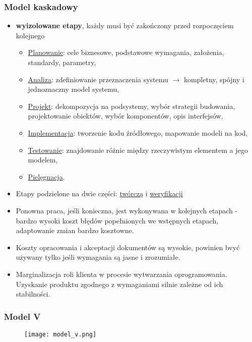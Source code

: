\documentclass[../main.tex]{subfiles}
\begin{document}
    \subsubsection{Model kaskadowy}
    \begin{itemize}
        \item \textbf{wyizolowane etapy}, każdy musi być zakończony przed rozpoczęciem kolejnego
        \begin{itemize}
            \item \underline{Planowanie}: cele biznesowe, podstawowe wymagania, założenia, standardy, parametry,
            \item \underline{Analiza}: zdefiniowanie przeznaczenia systemu $\rightarrow$ kompletny, spójny i jednoznaczny model systemu,
            \item \underline{Projekt}: dekompozycja na podsystemy, wybór strategii budowania, projektowanie obiektów, wybór komponentów, opis interfejsów,
            \item \underline{Implementacja}: tworzenie kodu źródłowego, mapowanie modeli na kod,
            \item \underline{Testowanie}: znajdowanie różnic między rzeczywistym elementem a jego modelem,
            \item \underline{Pielęgnacja}.
        \end{itemize}
        \item Etapy podzielone na dwie części: \underline{twórczą} i \underline{weryfikacji}
        \item Ponowna praca, jeśli konieczna, jest wykonywana w kolejnych etapach - bardzo wysoki koszt błędów
        popełnionych we wstępnych etapach, adaptowanie zmian bardzo kosztowne.
        \item Koszty opracowania i akceptacji dokumentów są wysokie, powinien bvyć używany
        tylko jeśli wymagania są jasne i zrozumiałe.
        \item Marginalizacja roli klienta w procesie wytwarzania oprogramowania. Uzyskanie produktu zgodnego z wymaganiami
        silnie zależne od ich stabilności.
    \end{itemize}

    \subsubsection{Model V}
    \begin{figure}[H]
        \texttt{[image: model\_v.png]}
    \end{figure}
\end{document}
